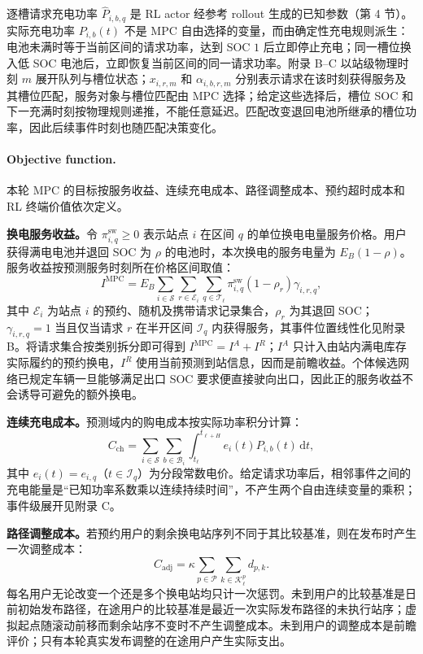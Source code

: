 \documentclass[12pt,a4paper,UTF8]{ctexart}
\begin{document}
逐槽请求充电功率 $\widehat P_{i,b,q}$ 是 RL actor 经参考 rollout 生成的已知参数（第 4 节）。实际充电功率 $P_{i,b}(t)$ 不是 MPC 自由选择的变量，而由确定性充电规则派生：电池未满时等于当前区间的请求功率，达到 SOC $1$ 后立即停止充电；同一槽位换入低 SOC 电池后，立即恢复当前区间的同一请求功率。附录 B--C 以站级物理时刻 $m$ 展开队列与槽位状态；$x_{i,r,m}$ 和 $\alpha_{i,b,r,m}$ 分别表示请求在该时刻获得服务及其槽位匹配，服务对象与槽位匹配由 MPC 选择；给定这些选择后，槽位 SOC 和下一充满时刻按物理规则递推，不能任意延迟。匹配改变退回电池所继承的槽位功率，因此后续事件时刻也随匹配决策变化。

\paragraph{Objective function.}
本轮 MPC 的目标按服务收益、连续充电成本、路径调整成本、预约超时成本和 RL 终端价值依次定义。

\textbf{换电服务收益。}令 $\pi_{i,q}^{\mathrm{sw}}\ge0$ 表示站点 $i$ 在区间 $q$ 的单位换电电量服务价格。用户获得满电电池并退回 SOC 为 $\rho$ 的电池时，本次换电的服务电量为 $E_B(1-\rho)$。服务收益按预测服务时刻所在价格区间取值：
\begin{equation}
I^{\mathrm{MPC}}
=E_B\sum_{i\in\mathcal S}
\sum_{r\in\mathcal E_i}
\sum_{q\in\mathcal T_\ell}
\pi_{i,q}^{\mathrm{sw}}(1-\rho_r)\gamma_{i,r,q},
\label{eq:income}
\end{equation}
其中 $\mathcal E_i$ 为站点 $i$ 的预约、随机及携带请求记录集合，$\rho_r$ 为其退回 SOC；$\gamma_{i,r,q}=1$ 当且仅当请求 $r$ 在半开区间 $\mathcal I_q$ 内获得服务，其事件位置线性化见附录 B。将请求集合按类别拆分即可得到 $I^{\mathrm{MPC}}=I^A+I^R$；$I^A$ 只计入由站内满电库存实际履约的预约换电，$I^R$ 使用当前预测到站信息，因而是前瞻收益。个体候选网络已规定车辆一旦能够满足出口 SOC 要求便直接驶向出口，因此正的服务收益不会诱导可避免的额外换电。

\textbf{连续充电成本。}预测域内的购电成本按实际功率积分计算：
\begin{equation}
C_{\mathrm{ch}}
=
\sum_{i\in\mathcal S}
\sum_{b\in\mathcal B_i}
\int_{t_\ell}^{t_{\ell+H}}
e_i(t)P_{i,b}(t)\,\mathrm dt,
\label{eq:chargingcost}
\end{equation}
其中 $e_i(t)=e_{i,q}$（$t\in\mathcal I_q$）为分段常数电价。给定请求功率后，相邻事件之间的充电能量是“已知功率系数乘以连续持续时间”，不产生两个自由连续变量的乘积；事件级展开见附录 C。

\textbf{路径调整成本。}若预约用户的剩余换电站序列不同于其比较基准，则在发布时产生一次调整成本：
\begin{equation}
C_{\mathrm{adj}}
=
\kappa
\sum_{p\in\mathcal P}
\sum_{k\in\mathcal K_\ell^p}
d_{p,k}.
\label{eq:adjustment_cost}
\end{equation}
每名用户无论改变一个还是多个换电站均只计一次惩罚。未到用户的比较基准是日前初始发布路径，在途用户的比较基准是最近一次实际发布路径的未执行站序；虚拟起点随滚动前移而剩余站序不变时不产生调整成本。未到用户的调整成本是前瞻评价；只有本轮真实发布调整的在途用户产生实际支出。
\end{document}
